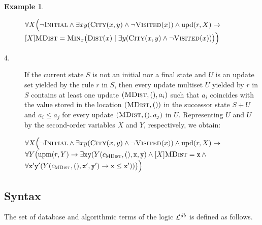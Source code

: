 \documentclass[preprint,11pt]{elsarticle}
\theoremstyle{definition}
\newtheorem{example}{Example}[section]
\theoremstyle{remark}
\begin{document}
\begin{example}
\begin{description}
$\forall X \Big(\neg \textsc{Initial} \wedge \exists  x y (\textsc{City}(x, y) \wedge \neg \textsc{Visited}(x)) \wedge \mathrm{upd}(r,X) \rightarrow$\\
\hspace*{2.8cm} $[X] \textsc{MDist} = \textsc{Min}_x\big(\textsc{Dist}(x) \mid \exists y (\textsc{City}(x, y) \wedge \neg \textsc{Visited}(x))\big)\Big)$\\[0.1cm]


\item [4.] If the current state $S$ is not an initial nor a final state and $U$ is an update set yielded by the rule $r$ in $S$, then every update multiset $\ddot{U}$ yielded by $r$ in $S$ contains at least one update $(\textsc{MDist}, (), a_i)$ such that $a_i$ coincides with the value stored in the location $(\textsc{MDist},())$ in the successor state $S+U$ and $a_i \leq a_j$ for every update $(\textsc{MDist},(), a_j)$ in $\ddot{U}$. Representing $U$ and $\ddot{U}$ by the second-order variables $X$ and $Y$, respectively, we obtain:

$\forall X \Big(\neg \textsc{Initial} \wedge \exists  x y (\textsc{City}(x, y) \wedge \neg \textsc{Visited}(x)) \wedge \mathrm{upd}(r,X) \rightarrow$\\
\hspace*{2.8cm} $\forall Y \big(\mathrm{upm}(r,Y) \rightarrow \exists \mathtt{x} \mathtt{y} (Y(c_{\textsc{MDist}},(),\mathtt{x},\mathtt{y}) \wedge [X]\textsc{MDist} = \mathtt{x} \, \wedge$\\
\hspace*{6.3cm} $\forall \mathtt{x}'\mathtt{y}' (Y(c_{\textsc{MDist}},(),\mathtt{x}',\mathtt{y}') \rightarrow \mathtt{x} \leq \mathtt{x}' )) \big)\Big)$

\end{description}

\end{example}






\subsection{Syntax}\label{subsec-adtmlogic-syntax}

The set of database and algorithmic terms of the logic ${\cal L}^{db}$ is defined as follows. 
\end{document}
